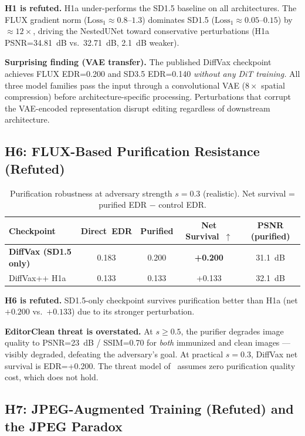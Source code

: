 \documentclass{article}
\begin{document}
\textbf{H1 is refuted.} H1a under-performs the SD1.5 baseline on all architectures.
The FLUX gradient norm ($\text{Loss}_1\approx0.8$--$1.3$) dominates SD1.5
($\text{Loss}_1\approx0.05$--$0.15$) by ${\approx}12\times$, driving the NestedUNet
toward conservative perturbations (H1a PSNR=34.81~dB vs.\ 32.71~dB, 2.1~dB weaker).

\textbf{Surprising finding (VAE transfer).} The published DiffVax checkpoint achieves
FLUX EDR=0.200 and SD3.5 EDR=0.140 \emph{without any DiT training.}
All three model families pass the input through a convolutional VAE ($8\times$ spatial
compression) before architecture-specific processing. Perturbations that corrupt the
VAE-encoded representation disrupt editing regardless of downstream architecture.

\subsection{H6: FLUX-Based Purification Resistance (Refuted)}
\label{sec:h6}

\begin{table}[t]
\caption{Purification robustness at adversary strength $s=0.3$ (realistic).
Net survival = purified EDR $-$ control EDR.}
\label{tab:h6}
\centering
\begin{tabular}{lcccc}
\toprule
Checkpoint & Direct~EDR & Purified & Net Survival~$\uparrow$ & PSNR (purified) \\
\midrule
\textbf{DiffVax (SD1.5 only)} & 0.183 & 0.200 & \textbf{+0.200} & 31.1~dB \\
DiffVax++ H1a & 0.133 & 0.133 & +0.133 & 32.1~dB \\
\bottomrule
\end{tabular}
\end{table}

\textbf{H6 is refuted.} SD1.5-only checkpoint survives purification better than H1a
(net $+0.200$ vs.\ $+0.133$) due to its stronger perturbation.

\textbf{EditorClean threat is overstated.} At $s\geq0.5$, the purifier degrades
image quality to PSNR=23~dB / SSIM=0.70 for \emph{both} immunized and clean images ---
visibly degraded, defeating the adversary's goal. At practical $s=0.3$, DiffVax
net survival is EDR=+0.200. The threat model of~\citet{zhao2026purify} assumes zero
purification quality cost, which does not hold.

\subsection{H7: JPEG-Augmented Training (Refuted) and the JPEG Paradox}
\end{document}
